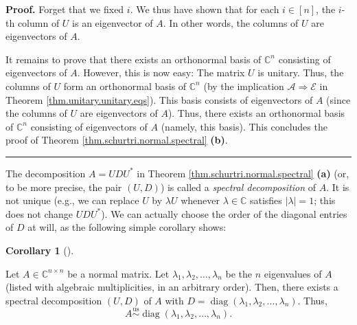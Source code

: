 \documentclass[numbers=enddot,12pt,final,onecolumn,notitlepage]{scrartcl}%
\numberwithin{exer}{subsection}
\theoremstyle{definition}
\newtheorem{coro}[theo]{Corollary}
\newenvironment{corollary}[1][]
{\begin{coro}[#1]\begin{leftbar}}
{\end{leftbar}\end{coro}}
\newenvironment{proof}[1][Proof]{\noindent\textbf{#1.} }{\ \rule{0.5em}{0.5em}}
\begin{document}
\begin{proof}
Forget that we fixed $i$. We thus have shown that for each $i\in\left[
n\right]  $, the $i$-th column of $U$ is an eigenvector of $A$. In other
words, the columns of $U$ are eigenvectors of $A$.

It remains to prove that there exists an orthonormal basis of $\mathbb{C}^{n}$
consisting of eigenvectors of $A$. However, this is now easy: The matrix $U$
is unitary. Thus, the columns of $U$ form an orthonormal basis of
$\mathbb{C}^{n}$ (by the implication $\mathcal{A}\Longrightarrow\mathcal{E}$
in Theorem \ref{thm.unitary.unitary.eqs}). This basis consists of eigenvectors
of $A$ (since the columns of $U$ are eigenvectors of $A$). Thus, there exists
an orthonormal basis of $\mathbb{C}^{n}$ consisting of eigenvectors of $A$
(namely, this basis). This concludes the proof of Theorem
\ref{thm.schurtri.normal.spectral} \textbf{(b)}.
\end{proof}

The decomposition $A=UDU^{\ast}$ in Theorem \ref{thm.schurtri.normal.spectral}
\textbf{(a)} (or, to be more precise, the pair $\left(  U,D\right)  $) is
called a \emph{spectral decomposition} of $A$. It is not unique (e.g., we can
replace $U$ by $\lambda U$ whenever $\lambda\in\mathbb{C}$ satisfies
$\left\vert \lambda\right\vert =1$; this does not change $UDU^{\ast}$). We can
actually choose the order of the diagonal entries of $D$ at will, as the
following simple corollary shows:

\begin{corollary}
\label{cor.schurtri.normal.given-order}Let $A\in\mathbb{C}^{n\times n}$ be a
normal matrix. Let $\lambda_{1},\lambda_{2},\ldots,\lambda_{n}$ be the $n$
eigenvalues of $A$ (listed with algebraic multiplicities, in an arbitrary
order). Then, there exists a spectral decomposition $\left(  U,D\right)  $ of
$A$ with $D=\operatorname*{diag}\left(  \lambda_{1},\lambda_{2},\ldots
,\lambda_{n}\right)  $. Thus,%
\begin{equation}
A\overset{\operatorname*{us}}{\sim}\operatorname*{diag}\left(  \lambda
_{1},\lambda_{2},\ldots,\lambda_{n}\right)  .
\label{eq.cor.schurtri.normal.given-order.us}%
\end{equation}

\end{corollary}
\end{document}
